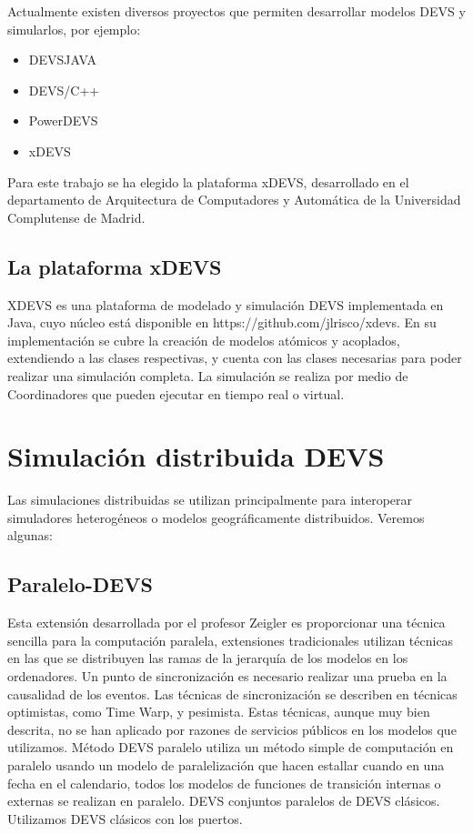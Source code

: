 Actualmente existen diversos proyectos que permiten desarrollar modelos DEVS y simularlos, por ejemplo:
\begin{itemize}
\item DEVSJAVA
\item DEVS/C++
\item PowerDEVS
\item xDEVS
\end{itemize}

Para este trabajo se ha elegido la plataforma xDEVS, desarrollado en el departamento de Arquitectura de Computadores y Automática de la Universidad Complutense de Madrid.  

\subsection{La plataforma xDEVS}
XDEVS es una plataforma de modelado y simulación DEVS implementada en Java, cuyo núcleo está disponible en https://github.com/jlrisco/xdevs. En su implementación se cubre la creación de modelos atómicos y acoplados, extendiendo a las clases respectivas, y cuenta con las clases necesarias para poder realizar una simulación completa. La simulación se realiza por medio de Coordinadores que pueden ejecutar en tiempo real o virtual.

\section{Simulación distribuida DEVS}
Las simulaciones distribuidas se utilizan principalmente para interoperar simuladores heterogéneos o modelos geográficamente distribuidos. Veremos algunas:

\subsection{Paralelo-DEVS}
Esta extensión desarrollada por el profesor Zeigler es proporcionar una técnica sencilla para la computación paralela, extensiones tradicionales utilizan técnicas en las que se distribuyen las ramas de la jerarquía de los modelos en los ordenadores. Un punto de sincronización es necesario realizar una prueba en la causalidad de los eventos. Las técnicas de sincronización se describen en técnicas optimistas, como Time Warp, y pesimista. Estas técnicas, aunque muy bien descrita, no se han aplicado por razones de servicios públicos en los modelos que utilizamos. Método DEVS paralelo utiliza un método simple de computación en paralelo usando un modelo de paralelización que hacen estallar cuando en una fecha en el calendario, todos los modelos de funciones de transición internas o externas se realizan en paralelo.
DEVS conjuntos paralelos de DEVS clásicos. Utilizamos DEVS clásicos con los puertos. 

